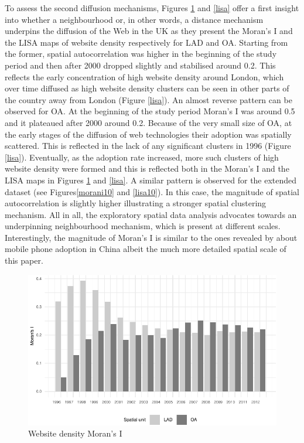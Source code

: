 \documentclass[
  authoryear,
  preprint,
  3p]{elsarticle}
\begin{document}
To assess the second diffusion mechanisms, Figures \ref{morani} and
\ref{lisa} offer a first insight into whether a neighbourhood or, in
other words, a distance mechanism underpins the diffusion of the Web in
the UK as they present the Moran's I and the LISA maps of website
density respectively for LAD and OA. Starting from the former, spatial
autocorrelation was higher in the beginning of the study period and then
after 2000 dropped slightly and stabilised around 0.2. This reflects the
early concentration of high website density around London, which over
time diffused as high website density clusters can be seen in other
parts of the country away from London (Figure \ref{lisa}). An almost
reverse pattern can be observed for OA. At the beginning of the study
period Moran's I was around 0.5 and it plateaued after 2000 around 0.2.
Because of the very small size of OA, at the early stages of the
diffusion of web technologies their adoption was spatially scattered.
This is reflected in the lack of any significant clusters in 1996
(Figure \ref{lisa}). Eventually, as the adoption rate increased, more
such clusters of high website density were formed and this is reflected
both in the Moran's I and the LISA maps in Figures \ref{morani} and
\ref{lisa}. A similar pattern is observed for the extended dataset (see
Figures\ref{morani10} and \ref{lisa10}). In this case, the magnitude of
spatial autocorrelation is slightly higher illustrating a stronger
spatial clustering mechanism. All in all, the exploratory spatial data
analysis advocates towards an underpinning neighbourhood mechanism,
which is present at different scales. Interestingly, the magnitude of
Moran's I is similar to the ones revealed by \citet{ding2010modeling}
about mobile phone adoption in China albeit the much more detailed
spatial scale of this paper.

\begin{figure}[H]

{\centering \includegraphics[width=1\textwidth,height=\textheight]{tranos2025_files/figure-pdf/morani-1.pdf}

}

\caption{\label{morani}Website density Moran's I}

\end{figure}%
\end{document}

